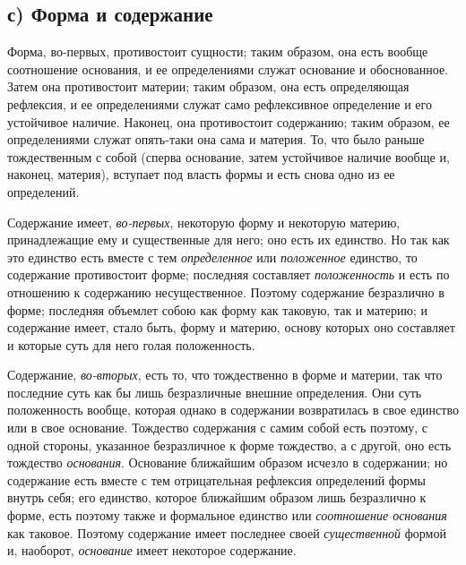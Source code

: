 \subsection[с) Форма и содержание]{с) Форма и содержание}
Форма, во-первых, противостоит сущности; таким
образом, она есть вообще соотношение основания, и ее определениями служат
основание и обоснованное. Затем она противостоит материи; таким образом,
она есть определяющая рефлексия, и ее определениями служат само
рефлексивное определение и его устойчивое наличие. Наконец, она
противостоит содержанию; таким образом, ее определениями служат опять-таки
она сама и материя. То, что было раньше тождественным с собой (сперва
основание, затем устойчивое наличие вообще и, наконец, материя), вступает
под власть формы и есть снова одно из ее определений.

Содержание имеет, {\em во-первых}, некоторую форму и
некоторую материю, принадлежащие ему и существенные для него; оно есть их
единство. Но так как это единство есть вместе с тем
{\em определенное} или
{\em положенное} единство, то содержание противостоит
форме; последняя составляет {\em положенность} и есть
по отношению к содержанию несущественное. Поэтому содержание безразлично в
форме; последняя объемлет собою как форму как таковую, так и материю; и
содержание имеет, стало быть, форму и материю, основу которых оно
составляет и которые суть для него голая положенность.

Содержание, {\em во-вторых}, есть то, что тождественно в
форме и материи, так что последние суть как бы лишь безразличные внешние
определения. Они суть положенность вообще, которая однако в содержании
возвратилась в свое единство или в свое основание. Тождество содержания с
самим собой есть поэтому, с одной стороны, указанное безразличное к форме
тождество, а с другой, оно есть тождество
{\em основания}. Основание ближайшим образом исчезло в
содержании; но содержание есть вместе с тем отрицательная рефлексия
определений формы внутрь себя; его единство, которое ближайшим образом лишь
безразлично к форме, есть поэтому также и формальное единство или
{\em соотношение основания} как таковое. Поэтому
содержание имеет последнее своей {\em существенной}
формой и, наоборот, {\em основание} имеет некоторое
содержание.

